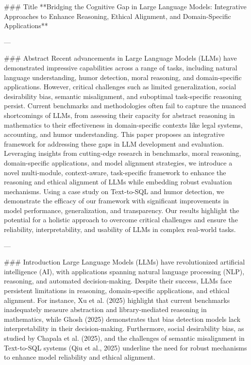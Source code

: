 ### Title  
**Bridging the Cognitive Gap in Large Language Models: Integrative Approaches to Enhance Reasoning, Ethical Alignment, and Domain-Specific Applications**  

---

### Abstract  
Recent advancements in Large Language Models (LLMs) have demonstrated impressive capabilities across a range of tasks, including natural language understanding, humor detection, moral reasoning, and domain-specific applications. However, critical challenges such as limited generalization, social desirability bias, semantic misalignment, and suboptimal task-specific reasoning persist. Current benchmarks and methodologies often fail to capture the nuanced shortcomings of LLMs, from assessing their capacity for abstract reasoning in mathematics to their effectiveness in domain-specific contexts like legal systems, accounting, and humor understanding. This paper proposes an integrative framework for addressing these gaps in LLM development and evaluation. Leveraging insights from cutting-edge research in benchmarks, moral reasoning, domain-specific applications, and model alignment strategies, we introduce a novel multi-module, context-aware, task-specific framework to enhance the reasoning and ethical alignment of LLMs while embedding robust evaluation mechanisms. Using a case study on Text-to-SQL and humor detection, we demonstrate the efficacy of our framework with significant improvements in model performance, generalization, and transparency. Our results highlight the potential for a holistic approach to overcome critical challenges and ensure the reliability, interpretability, and usability of LLMs in complex real-world tasks.  

---

### Introduction  
Large Language Models (LLMs) have revolutionized artificial intelligence (AI), with applications spanning natural language processing (NLP), reasoning, and automated decision-making. Despite their success, LLMs face persistent limitations in reasoning, domain-specific applications, and ethical alignment. For instance, Xu et al. (2025) highlight that current benchmarks inadequately measure abstraction and library-mediated reasoning in mathematics, while Ghosh (2025) demonstrates that bias detection models lack interpretability in their decision-making. Furthermore, social desirability bias, as studied by Chapala et al. (2025), and the challenges of semantic misalignment in Text-to-SQL systems (Qiu et al., 2025) underline the need for robust mechanisms to enhance model reliability and ethical alignment.  

